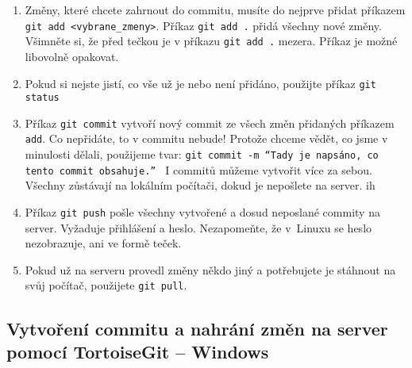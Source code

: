 \begin{enumerate}
	\item Změny, které chcete zahrnout do commitu,  musíte do nejprve přidat příkazem {\tt git add <vybrane\_zmeny>}. 
	Příkaz {\tt git add .} přidá všechny nové změny.  Všimněte si, že před tečkou je 
	v příkazu {\tt git add .} mezera. Příkaz je možné libovolně opakovat. 
	
	\item Pokud si nejste jistí, co vše už je nebo není přidáno, použijte příkaz {\tt git status}
	
	\item Příkaz {\tt git commit} vytvoří nový commit ze všech změn přidaných příkazem {\tt add}. Co nepřidáte, to v commitu nebude!
	Protože chceme vědět, co jsme v minulosti dělali, použijeme tvar: 
	{\tt git commit -m ``Tady je napsáno, co tento commit obsahuje.'' }  I commitů můžeme vytvořit více za sebou. Všechny zůstávají na lokálním počítači, dokud je nepošlete na server. 
	ih
	\item Příkaz {\tt git push} pošle všechny vytvořené a dosud neposlané commity na server. 
	Vyžaduje přihlášení a heslo. 
	Nezapomeňte, že v~Linuxu se heslo nezobrazuje, ani ve formě teček. 
	
	\item Pokud už na serveru provedl změny někdo jiný a potřebujete je stáhnout na svůj počítač, použijete {\tt git pull}.
	
\end{enumerate}


\subsection{Vytvoření commitu a nahrání změn na server pomocí TortoiseGit -- Windows}

